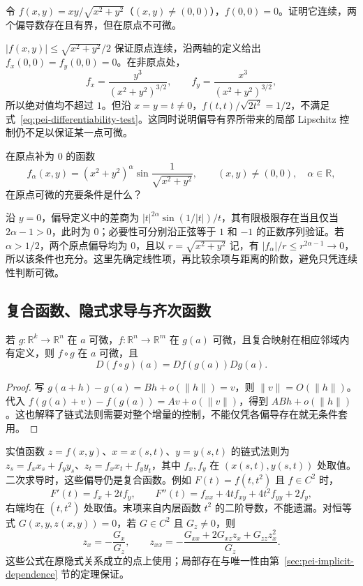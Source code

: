 \begin{example}
\label{ex:pei-bounded-partials-not-differentiable}
令 $f(x,y)=xy/\sqrt{x^2+y^2}$（$(x,y)\ne(0,0)$），$f(0,0)=0$。证明它连续，两个偏导数存在且有界，但在原点不可微。
\end{example}
\begin{solve}
$|f(x,y)|\le\sqrt{x^2+y^2}/2$ 保证原点连续，沿两轴的定义给出 $f_x(0,0)=f_y(0,0)=0$。在非原点处，
\[
f_x=\frac{y^3}{(x^2+y^2)^{3/2}},\qquad f_y=\frac{x^3}{(x^2+y^2)^{3/2}},
\]
所以绝对值均不超过 $1$。但沿 $x=y=t\ne0$，$f(t,t)/\sqrt{2t^2}=1/2$，不满足式~\eqref{eq:pei-differentiability-test}。这同时说明偏导有界所带来的局部 Lipschitz 控制仍不足以保证某一点可微。
\end{solve}

\begin{example}
在原点补为 $0$ 的函数
\[
f_\alpha(x,y)=(x^2+y^2)^\alpha\sin\frac1{\sqrt{x^2+y^2}},\qquad (x,y)\ne(0,0),\quad\alpha\in\mathbb R,
\]
在原点可微的充要条件是什么？
\end{example}
\begin{solve}
沿 $y=0$，偏导定义中的差商为 $|t|^{2\alpha}\sin(1/|t|)/t$，其有限极限存在当且仅当 $2\alpha-1>0$，此时为 $0$；必要性可分别沿正弦等于 $1$ 和 $-1$ 的正数序列验证。若 $\alpha>1/2$，两个原点偏导均为 $0$，且以 $r=\sqrt{x^2+y^2}$ 记，有 $|f_\alpha|/r\le r^{2\alpha-1}\to0$，所以该条件也充分。这里先确定线性项，再比较余项与距离的阶数，避免只凭连续性判断可微。
\end{solve}

\subsection{复合函数、隐式求导与齐次函数}

\begin{theorem}
\label{thm:pei-chain-rule}
若 $g:\mathbb R^k\to\mathbb R^n$ 在 $a$ 可微，$f:\mathbb R^n\to\mathbb R^m$ 在 $g(a)$ 可微，且复合映射在相应邻域内有定义，则 $f\circ g$ 在 $a$ 可微，且
\[
D(f\circ g)(a)=Df(g(a))Dg(a).
\]
\end{theorem}
\begin{proof}
写 $g(a+h)-g(a)=Bh+o(\|h\|)=v$，则 $\|v\|=O(\|h\|)$。代入 $f(g(a)+v)-f(g(a))=Av+o(\|v\|)$，得到 $ABh+o(\|h\|)$。这也解释了链式法则需要对整个增量的控制，不能仅凭各偏导存在就无条件套用。
\end{proof}

实值函数 $z=f(x,y)$、$x=x(s,t)$、$y=y(s,t)$ 的链式法则为 $z_s=f_xx_s+f_yy_s$、$z_t=f_xx_t+f_yy_t$，其中 $f_x,f_y$ 在 $(x(s,t),y(s,t))$ 处取值。二次求导时，这些偏导仍是复合函数。例如 $F(t)=f(t,t^2)$ 且 $f\in C^2$ 时，
\[
F'(t)=f_x+2tf_y,\qquad F''(t)=f_{xx}+4tf_{xy}+4t^2f_{yy}+2f_y,
\]
右端均在 $(t,t^2)$ 处取值。末项来自内层函数 $t^2$ 的二阶导数，不能遗漏。对恒等式 $G(x,y,z(x,y))=0$，若 $G\in C^2$ 且 $G_z\ne0$，则
\[
z_x=-\frac{G_x}{G_z},\qquad z_{xx}=-\frac{G_{xx}+2G_{xz}z_x+G_{zz}z_x^2}{G_z}.
\]
这些公式在原隐式关系成立的点上使用；局部存在与唯一性由第~\ref{sec:pei-implicit-dependence} 节的定理保证。

